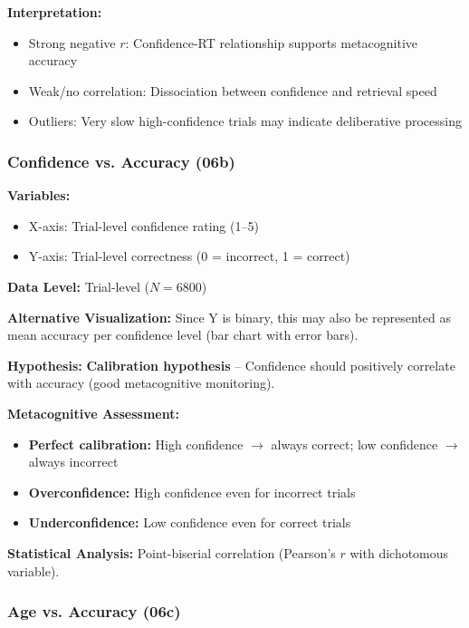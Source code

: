 \documentclass[12pt,a4paper]{article}
\begin{document}
\textbf{Interpretation:}
\begin{itemize}
    \item Strong negative $r$: Confidence-RT relationship supports metacognitive accuracy
    \item Weak/no correlation: Dissociation between confidence and retrieval speed
    \item Outliers: Very slow high-confidence trials may indicate deliberative processing
\end{itemize}

\subsubsection{Confidence vs. Accuracy (06b)}

\textbf{Variables:}
\begin{itemize}
    \item X-axis: Trial-level confidence rating (1--5)
    \item Y-axis: Trial-level correctness (0 = incorrect, 1 = correct)
\end{itemize}

\textbf{Data Level:} Trial-level ($N=6800$)

\textbf{Alternative Visualization:} Since Y is binary, this may also be represented as mean accuracy per confidence level (bar chart with error bars).

\textbf{Hypothesis:} \textbf{Calibration hypothesis} -- Confidence should positively correlate with accuracy (good metacognitive monitoring).

\textbf{Metacognitive Assessment:}
\begin{itemize}
    \item \textbf{Perfect calibration:} High confidence $\rightarrow$ always correct; low confidence $\rightarrow$ always incorrect
    \item \textbf{Overconfidence:} High confidence even for incorrect trials
    \item \textbf{Underconfidence:} Low confidence even for correct trials
\end{itemize}

\textbf{Statistical Analysis:} Point-biserial correlation (Pearson's $r$ with dichotomous variable).

\subsubsection{Age vs. Accuracy (06c)}
\end{document}
